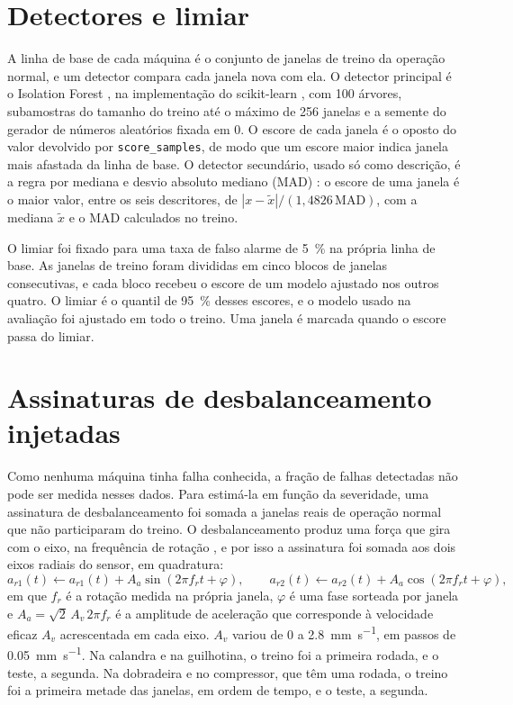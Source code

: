 \section{Detectores e limiar}\label{sec:detectores}

A linha de base de cada máquina é o conjunto de janelas de treino da operação normal, e um detector compara cada janela nova com ela. O detector principal é o Isolation Forest \cite{liu2008}, na implementação do scikit-learn \cite{scikitlearn2026}, com \num{100} árvores, subamostras do tamanho do treino até o máximo de \num{256} janelas e a semente do gerador de números aleatórios fixada em 0. O escore de cada janela é o oposto do valor devolvido por \texttt{score\_samples}, de modo que um escore maior indica janela mais afastada da linha de base. O detector secundário, usado só como descrição, é a regra por mediana e desvio absoluto mediano (MAD) \cite{leys2013}: o escore de uma janela é o maior valor, entre os seis descritores, de $|x - \tilde{x}|/(1{,}4826\,\mathrm{MAD})$, com a mediana $\tilde{x}$ e o MAD calculados no treino.

O limiar foi fixado para uma taxa de falso alarme de \SI{5}{\percent} na própria linha de base. As janelas de treino foram divididas em cinco blocos de janelas consecutivas, e cada bloco recebeu o escore de um modelo ajustado nos outros quatro. O limiar é o quantil de \SI{95}{\percent} desses escores, e o modelo usado na avaliação foi ajustado em todo o treino. Uma janela é marcada quando o escore passa do limiar.

\section{Assinaturas de desbalanceamento injetadas}\label{sec:injecao}

Como nenhuma máquina tinha falha conhecida, a fração de falhas detectadas não pode ser medida nesses dados. Para estimá-la em função da severidade, uma assinatura de desbalanceamento foi somada a janelas reais de operação normal que não participaram do treino. O desbalanceamento produz uma força que gira com o eixo, na frequência de rotação \cite{randall2011livro}, e por isso a assinatura foi somada aos dois eixos radiais do sensor, em quadratura:
\begin{equation}
a_{r1}(t) \leftarrow a_{r1}(t) + A_a \sin(2\pi f_r t + \varphi), \qquad a_{r2}(t) \leftarrow a_{r2}(t) + A_a \cos(2\pi f_r t + \varphi),
\label{eq:injecao}
\end{equation}
em que $f_r$ é a rotação medida na própria janela, $\varphi$ é uma fase sorteada por janela e $A_a = \sqrt{2}\,A_v\,2\pi f_r$ é a amplitude de aceleração que corresponde à velocidade eficaz $A_v$ acrescentada em cada eixo. $A_v$ variou de 0 a \SI{2,8}{\milli\meter\per\second}, em passos de \SI{0,05}{\milli\meter\per\second}. Na calandra e na guilhotina, o treino foi a primeira rodada, e o teste, a segunda. Na dobradeira e no compressor, que têm uma rodada, o treino foi a primeira metade das janelas, em ordem de tempo, e o teste, a segunda.

